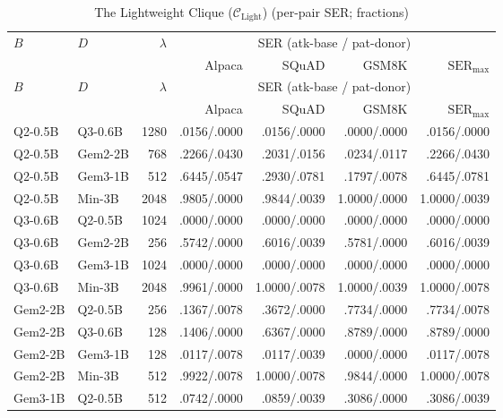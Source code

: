 \begingroup
\small
\setlength{\tabcolsep}{3pt}
\begin{longtable}{@{}llrrrrr@{}}
\caption{The Lightweight Clique ($\mathcal{C}_{\text{Light}}$) (per-pair SER; fractions)}\label{tab:app:small-bidirectional:ser}\\
\toprule
$B$ & $D$ & $\lambda$ & \multicolumn{4}{c}{SER (atk-base / pat-donor)} \\
\cmidrule(lr){4-7}
 &  &  & Alpaca & SQuAD & GSM8K & $\mathrm{SER}_{\max}$ \\
\midrule
\endfirsthead
\toprule
$B$ & $D$ & $\lambda$ & \multicolumn{4}{c}{SER (atk-base / pat-donor)} \\
\cmidrule(lr){4-7}
 &  &  & Alpaca & SQuAD & GSM8K & $\mathrm{SER}_{\max}$ \\
\midrule
\endhead
\bottomrule
\endfoot
\rowcolor{rowPI} Q2-0.5B & Q3-0.6B & 1280 & .0156/.0000 & .0156/.0000 & .0000/.0000 & .0156/.0000 \\
\rowcolor{rowPI} Q2-0.5B & Gem2-2B & 768 & .2266/.0430 & .2031/.0156 & .0234/.0117 & .2266/.0430 \\
\rowcolor{rowPI} Q2-0.5B & Gem3-1B & 512 & .6445/.0547 & .2930/.0781 & .1797/.0078 & .6445/.0781 \\
\rowcolor{rowPI} Q2-0.5B & Min-3B & 2048 & .9805/.0000 & .9844/.0039 & 1.0000/.0000 & 1.0000/.0039 \\
\rowcolor{rowIP} Q3-0.6B & Q2-0.5B & 1024 & .0000/.0000 & .0000/.0000 & .0000/.0000 & .0000/.0000 \\
\rowcolor{rowII} Q3-0.6B & Gem2-2B & 256 & .5742/.0000 & .6016/.0039 & .5781/.0000 & .6016/.0039 \\
\rowcolor{rowII} Q3-0.6B & Gem3-1B & 1024 & .0000/.0000 & .0000/.0000 & .0000/.0000 & .0000/.0000 \\
\rowcolor{rowII} Q3-0.6B & Min-3B & 2048 & .9961/.0000 & 1.0000/.0078 & 1.0000/.0039 & 1.0000/.0078 \\
\rowcolor{rowIP} Gem2-2B & Q2-0.5B & 256 & .1367/.0078 & .3672/.0000 & .7734/.0000 & .7734/.0078 \\
\rowcolor{rowII} Gem2-2B & Q3-0.6B & 128 & .1406/.0000 & .6367/.0000 & .8789/.0000 & .8789/.0000 \\
\rowcolor{rowII} Gem2-2B & Gem3-1B & 128 & .0117/.0078 & .0117/.0039 & .0000/.0000 & .0117/.0078 \\
\rowcolor{rowII} Gem2-2B & Min-3B & 512 & .9922/.0078 & 1.0000/.0078 & .9844/.0000 & 1.0000/.0078 \\
\rowcolor{rowIP} Gem3-1B & Q2-0.5B & 512 & .0742/.0000 & .0859/.0039 & .3086/.0000 & .3086/.0039 \\

\end{longtable}
